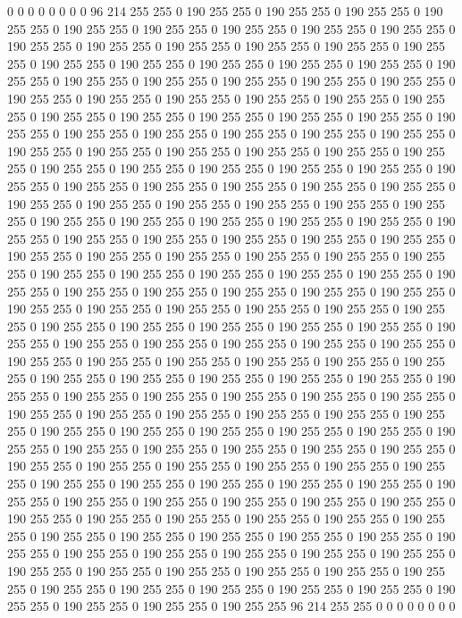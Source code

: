 0 0 0 0 0 0 0 0 96 214 255 255 0 190 255 255 0 190 255 255 0 190 255 255 0 190 255 255 0 190 255 255 0 190 255 255 0 190 255 255 0 190 255 255 0 190 255 255 0 190 255 255 0 190 255 255 0 190 255 255 0 190 255 255 0 190 255 255 0 190 255 255 0 190 255 255 0 190 255 255 0 190 255 255 0 190 255 255 0 190 255 255 0 190 255 255 0 190 255 255 0 190 255 255 0 190 255 255 0 190 255 255 0 190 255 255 0 190 255 255 0 190 255 255 0 190 255 255 0 190 255 255 0 190 255 255 0 190 255 255 0 190 255 255 0 190 255 255 0 190 255 255 0 190 255 255 0 190 255 255 0 190 255 255 0 190 255 255 0 190 255 255 0 190 255 255 0 190 255 255 0 190 255 255 0 190 255 255 0 190 255 255 0 190 255 255 0 190 255 255 
0 190 255 255 0 190 255 255 0 190 255 255 0 190 255 255 0 190 255 255 0 190 255 255 0 190 255 255 0 190 255 255 0 190 255 255 0 190 255 255 0 190 255 255 0 190 255 255 0 190 255 255 0 190 255 255 0 190 255 255 0 190 255 255 0 190 255 255 0 190 255 255 0 190 255 255 0 190 255 255 0 190 255 255 0 190 255 255 0 190 255 255 0 190 255 255 0 190 255 255 0 190 255 255 0 190 255 255 0 190 255 255 0 190 255 255 0 190 255 255 0 190 255 255 0 190 255 255 0 190 255 255 0 190 255 255 0 190 255 255 0 190 255 255 0 190 255 255 0 190 255 255 0 190 255 255 0 190 255 255 0 190 255 255 0 190 255 255 0 190 255 255 0 190 255 255 0 190 255 255 0 190 255 255 0 190 255 255 0 190 255 255 0 190 255 255 0 190 255 255 
0 190 255 255 0 190 255 255 0 190 255 255 0 190 255 255 0 190 255 255 0 190 255 255 0 190 255 255 0 190 255 255 0 190 255 255 0 190 255 255 0 190 255 255 0 190 255 255 0 190 255 255 0 190 255 255 0 190 255 255 0 190 255 255 0 190 255 255 0 190 255 255 0 190 255 255 0 190 255 255 0 190 255 255 0 190 255 255 0 190 255 255 0 190 255 255 0 190 255 255 0 190 255 255 0 190 255 255 0 190 255 255 0 190 255 255 0 190 255 255 0 190 255 255 0 190 255 255 0 190 255 255 0 190 255 255 0 190 255 255 0 190 255 255 0 190 255 255 0 190 255 255 0 190 255 255 0 190 255 255 0 190 255 255 0 190 255 255 0 190 255 255 0 190 255 255 0 190 255 255 0 190 255 255 0 190 255 255 0 190 255 255 0 190 255 255 0 190 255 255 
0 190 255 255 0 190 255 255 0 190 255 255 0 190 255 255 0 190 255 255 0 190 255 255 0 190 255 255 0 190 255 255 0 190 255 255 0 190 255 255 0 190 255 255 0 190 255 255 0 190 255 255 0 190 255 255 0 190 255 255 0 190 255 255 0 190 255 255 0 190 255 255 0 190 255 255 0 190 255 255 0 190 255 255 0 190 255 255 0 190 255 255 0 190 255 255 0 190 255 255 0 190 255 255 0 190 255 255 0 190 255 255 0 190 255 255 0 190 255 255 0 190 255 255 0 190 255 255 0 190 255 255 0 190 255 255 0 190 255 255 0 190 255 255 0 190 255 255 0 190 255 255 0 190 255 255 0 190 255 255 0 190 255 255 0 190 255 255 0 190 255 255 0 190 255 255 0 190 255 255 0 190 255 255 0 190 255 255 96 214 255 255 0 0 0 0 0 0 0 0 
